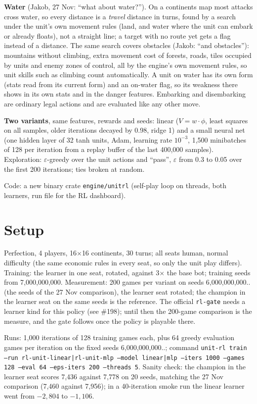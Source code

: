 \documentclass{../polyexp}
\begin{document}
\textbf{Water} (Jakob, 27 Nov: ``what about water?''). On a continents map most attacks cross water, so every distance
is a \emph{travel} distance in turns, found by a search under the unit's own movement rules (land, and water where the
unit can embark or already floats), not a straight line; a target with no route yet gets a flag instead of a distance.
The same search covers obstacles (Jakob: ``and obstacles''): mountains without climbing, extra movement cost of
forests, roads, tiles occupied by units and enemy zones of control, all by the engine's own movement rules, so unit
skills such as climbing count automatically.
A unit on water has its own form (stats read from its current form) and an on-water flag, so its weakness there shows
in its own stats and in the danger features. Embarking and disembarking are ordinary legal actions and are evaluated
like any other move.

\textbf{Two variants}, same features, rewards and seeds: linear ($V = w \cdot \phi$, least squares on all samples,
older iterations decayed by 0.98, ridge 1) and a small neural net (one hidden layer of 32 tanh units, Adam, learning
rate $10^{-3}$, 1{,}500 minibatches of 128 per iteration from a replay buffer of the last 400{,}000 samples).
Exploration: $\varepsilon$-greedy over the unit actions and ``pass'', $\varepsilon$ from 0.3 to 0.05 over the first
200 iterations; ties broken at random.

Code: a new binary crate \texttt{engine/unitrl} (self-play loop on threads, both learners, run file for the RL dashboard).

\section{Setup}
Perfection, 4 players, 16$\times$16 continents, 30 turns; all seats human, normal difficulty (the same economic rules
in every seat, so only the unit play differs). Training: the learner in one seat, rotated, against 3$\times$ the base
bot; training seeds from 7{,}000{,}000{,}000. Measurement: 200 games per variant on seeds 6{,}000{,}000{,}000.. (the
seeds of the 27 Nov comparison), the learner seat rotated; the champion in the learner seat on the same seeds is the
reference. The official \texttt{rl-gate} needs a learner kind for this policy (see \#198); until then the 200-game
comparison is the measure, and the gate follows once the policy is playable there.

Runs: 1{,}000 iterations of 128 training games each, plus 64 greedy evaluation games per iteration on the fixed seeds
6{,}000{,}000{,}000..; command \texttt{unit-rl train --run rl-unit-linear|rl-unit-mlp --model linear|mlp --iters 1000
--games 128 --eval 64 --eps-iters 200 --threads 5}. Sanity check: the champion in the learner seat scores 7{,}436
against 7{,}778 on 20 seeds, matching the 27 Nov comparison (7{,}460 against 7{,}956); in a 40-iteration smoke run the
linear learner went from $-2{,}804$ to $-1{,}106$.
\end{document}
